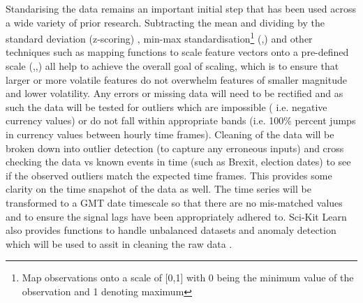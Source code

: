 \documentclass[11pt]{article}
\begin{document}
\par Standarising the data remains an important initial step that has been used across a wide variety of prior research. Subtracting the mean and dividing by the standard deviation (z-scoring) \cite{Fischer2018}, min-max standardisation\footnote{Map observations onto a scale of [0,1] with 0 being the minimum value of the observation and 1 denoting maximum} (\cite{Gunduz2017},\cite{Kumar2006})  and other techniques such as  mapping functions to scale feature vectors onto a pre-defined scale (\cite{Kara2011},\cite{Wang2014},\cite{Patel2015}) all help to achieve the overall goal of scaling, which is to ensure that larger or more volatile features do not overwhelm features of smaller magnitude and lower volatility. 
\newline Any errors or missing data will need to be rectified and as such the data will be tested for outliers which are impossible ( i.e. negative currency values) or do not fall within appropriate bands (i.e. 100\% percent jumps in currency values between hourly time frames). Cleaning of the data will be broken down into outlier detection (to capture any erroneous inputs) and cross checking the data vs known events in time (such as Brexit, election dates) to see if the observed outliers match the expected time frames. This provides some clarity on the time snapshot of the data as well. The time series will be transformed to a GMT date timescale so that there are no mis-matched values and to ensure the signal lags have been appropriately adhered to. 
\newline Sci-Kit Learn also provides functions to handle unbalanced datasets and anomaly detection which will be used to assit in cleaning the raw data \cite{anomalydetection}.
\end{document}
